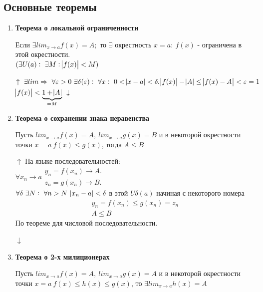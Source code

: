 \documentclass{article}
\begin{document}
  \subsection{Основные теоремы}
  \begin{enumerate}
    \item \textbf{Теорема о локальной ограниченности}

    Если \(\exists lim_{x \rightarrow a} f(x) = A;\) то \(\exists\) окрестность \(x = a:\ f(x)\) - ограничена в этой окрестности. \\
    \( (\exists U(a):\ \exists M: \abs{f(x)} < M) \)

    \(\uparrow\ \exists lim \Rightarrow\ \forall \varepsilon > 0\ \exists \delta(\varepsilon):\ \forall x:\ 0 < \abs{x-a} < \delta.\\ \abs{f(x)}-\abs{A} \leq \abs{f(x)-A}<\varepsilon=1\)\\
    \(\abs{f(x)}< \underbrace{1+\abs{A}}_{=M}\ \downarrow\)

    \item \textbf{Теорема о сохранении знака неравенства}

    Пусть \( lim_{x \rightarrow a} f(x) = A,\ lim_{x \rightarrow a} g(x) = B \) и в некоторой окрестности точки \(x = a\ f(x) \leq g(x)\), тогда \( A \leq B \)

    \(\uparrow\) На языке последовательностей:\\
    \(\forall x_n \rightarrow a \begin{array}{l} y_n = f(x_n) \rightarrow A.\\ z_n = g(x_n) \rightarrow B. \end{array}\)\\
    \(\forall \delta\ \exists N:\ \forall n > N\ \abs{x_n - a} < \delta\) в этой \(U \delta(a)\) начиная с некоторого номера
    \begin{equation*}
      \begin{array}{l}
        y_n = f(x_n) \leq g(x_n) = z_n \\
        A \leq B
      \end{array}
    \end{equation*}
    По теореме для числовой последовательности.

    \(\downarrow\)

    \item \textbf{Теорема о 2-х милиционерах}
    
    Пусть \( lim_{x \rightarrow a} f(x) = A,\ lim_{x \rightarrow a} g(x) = A \) и в некоторой окрестности точки \(x = a\ f(x) \leq h(x) \leq g(x)\), то \(\exists lim_{x \rightarrow a} h(x) = A\)


\end{enumerate}
\end{document}
